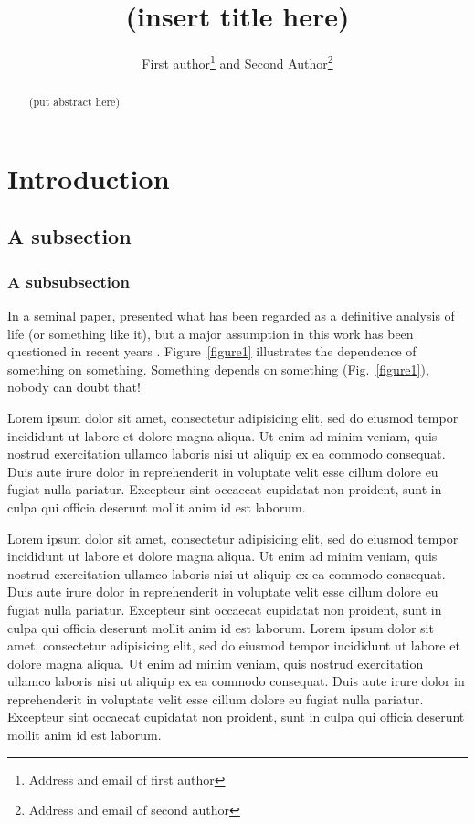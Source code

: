 \documentclass[12pt,titlepage,figuresatend]{article}
\title{(insert title here)}
\author{First author\footnote{Address and email of first author} and Second Author\footnote{Address and email of second author}}
\date{}
\begin{document}
\maketitle

\begin{abstract}
(put abstract here)
\end{abstract}

\listoffigures

\section{Introduction}

\subsection{A subsection}
\subsubsection{A subsubsection}

In a seminal paper, \cite{Pants+Friend:1908} presented what has been
regarded as a definitive analysis of life (or something like it), but
a major assumption in this work has been questioned in recent years
\cite[]{Smarter:2008}. Figure~\ref{figure1} illustrates the dependence
of something on something.  Something depends on something
(Fig.~\ref{figure1}), nobody can doubt that!

Lorem ipsum dolor sit amet, consectetur adipisicing elit, sed do
eiusmod tempor incididunt ut labore et dolore magna aliqua. Ut enim ad
minim veniam, quis nostrud exercitation ullamco laboris nisi ut
aliquip ex ea commodo consequat. Duis aute irure dolor in
reprehenderit in voluptate velit esse cillum dolore eu fugiat nulla
pariatur.  Excepteur sint occaecat cupidatat non proident, sunt in
culpa qui officia deserunt mollit anim id est laborum.


Lorem ipsum dolor sit amet, consectetur adipisicing elit, sed do eiusmod tempor
incididunt ut labore et dolore magna aliqua. Ut enim ad minim veniam, quis nostrud
exercitation ullamco laboris nisi ut aliquip ex ea commodo consequat. Duis aute irure
dolor in reprehenderit in voluptate velit esse cillum dolore eu fugiat nulla pariatur.
Excepteur sint occaecat cupidatat non proident, sunt in culpa qui officia deserunt
mollit anim id est laborum. Lorem ipsum dolor sit amet, consectetur adipisicing elit,
sed do eiusmod tempor incididunt ut labore et dolore magna aliqua. Ut enim ad minim
veniam, quis nostrud exercitation ullamco laboris nisi ut aliquip ex ea commodo
consequat. Duis aute irure dolor in reprehenderit in voluptate velit esse cillum
dolore eu fugiat nulla pariatur. Excepteur sint occaecat cupidatat non proident, sunt
in culpa qui officia deserunt mollit anim id est laborum.
\end{document}
